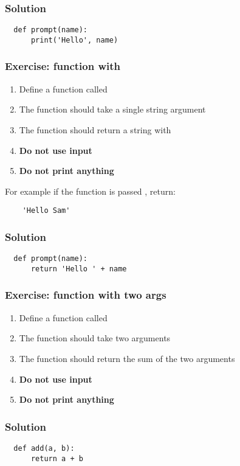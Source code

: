 \documentclass[14pt,compress]{beamer}
\begin{document}
\begin{frame}
\frametitle{Solution}
\begin{lstlisting}
  def prompt(name):
      print('Hello', name)
\end{lstlisting}
\end{frame}


\begin{frame}
  \frametitle{Exercise: function with }
  \begin{enumerate}
  \item Define a function called 
  \item The function should take a single string argument
  \item The function should return a string with 
  \item \textbf{Do not use input}
  \item \textbf{Do not print anything}
  \end{enumerate}
  For example if the function is passed , return:
  \begin{lstlisting}
    'Hello Sam'
  \end{lstlisting}
\end{frame}

\begin{frame}
\frametitle{Solution}
\begin{lstlisting}
  def prompt(name):
      return 'Hello ' + name
\end{lstlisting}
\end{frame}

\begin{frame}[plain]
  \frametitle{Exercise: function with two args}
  \begin{enumerate}
  \item Define a function called 
  \item The function should take two arguments
  \item The function should return the sum of the two arguments
  \item \textbf{Do not use input}
  \item \textbf{Do not print anything}
  \end{enumerate}
\end{frame}

\begin{frame}
\frametitle{Solution}
\begin{lstlisting}
  def add(a, b):
      return a + b
\end{lstlisting}
\end{frame}
\end{document}
